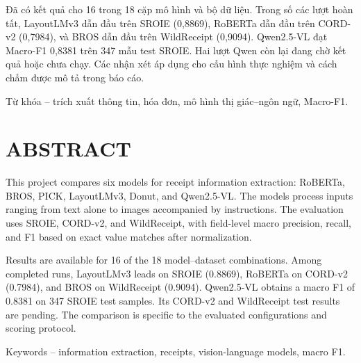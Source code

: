 Đã có kết quả cho 16 trong 18 cặp mô hình và bộ dữ liệu. Trong số các lượt hoàn tất, LayoutLMv3 dẫn đầu trên SROIE (0,8869), RoBERTa dẫn đầu trên CORD-v2 (0,7984), và BROS dẫn đầu trên WildReceipt (0,9094). Qwen2.5-VL đạt Macro-F1 0,8381 trên 347 mẫu test SROIE. Hai lượt Qwen còn lại đang chờ kết quả hoặc chưa chạy. Các nhận xét áp dụng cho cấu hình thực nghiệm và cách chấm được mô tả trong báo cáo.

Từ khóa -- trích xuất thông tin, hóa đơn, mô hình thị giác--ngôn ngữ, Macro-F1.

\chapter*{ABSTRACT}
This project compares six models for receipt information extraction: RoBERTa, BROS, PICK, LayoutLMv3, Donut, and Qwen2.5-VL. The models process inputs ranging from text alone to images accompanied by instructions. The evaluation uses SROIE, CORD-v2, and WildReceipt, with field-level macro precision, recall, and F1 based on exact value matches after normalization.

Results are available for 16 of the 18 model--dataset combinations. Among completed runs, LayoutLMv3 leads on SROIE (0.8869), RoBERTa on CORD-v2 (0.7984), and BROS on WildReceipt (0.9094). Qwen2.5-VL obtains a macro F1 of 0.8381 on 347 SROIE test samples. Its CORD-v2 and WildReceipt test results are pending. The comparison is specific to the evaluated configurations and scoring protocol.

Keywords -- information extraction, receipts, vision-language models, macro F1.

\clearpage
\begingroup
\renewcommand{\baselinestretch}{1.05}\normalsize
\tableofcontents
\endgroup
\clearpage
{}\listoffigures
\clearpage
{}\listoftables
